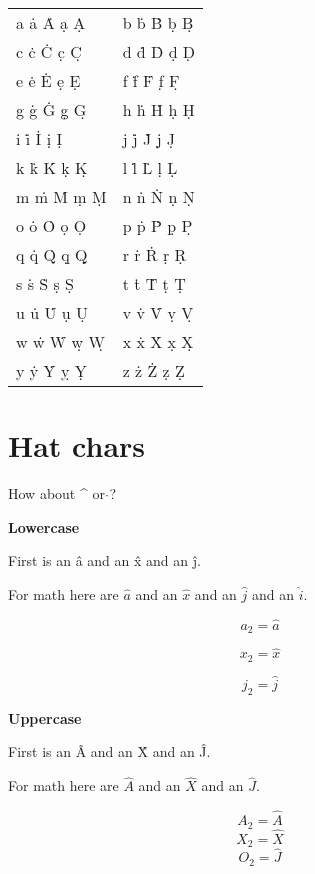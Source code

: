 \documentclass{article}
\begin{document}
\begin{tabular} {p{2in} p{2in}}
a \.{a} \.{A} \d{a} \d{A} &
b \.{b} \.{B} \d{b} \d{B} \\
c \.{c} \.{C} \d{c} \d{C} &
d \.{d} \.{D} \d{d} \d{D} \\
e \.{e} \.{E} \d{e} \d{E} &
f \.{f} \.{F} \d{f} \d{F} \\
g \.{g} \.{G} \d{g} \d{G} &
h \.{h} \.{H} \d{h} \d{H} \\
i \.{i} \.{I} \d{i} \d{I} &
j \.{j} \.{J} \d{j} \d{J} \\
k \.{k} \.{K} \d{k} \d{K} &
l \.{l} \.{L} \d{l} \d{L} \\
m \.{m} \.{M} \d{m} \d{M} &
n \.{n} \.{N} \d{n} \d{N} \\
o \.{o} \.{O} \d{o} \d{O} &
p \.{p} \.{P} \d{p} \d{P} \\
q \.{q} \.{Q} \d{q} \d{Q} &
r \.{r} \.{R} \d{r} \d{R} \\
s \.{s} \.{S} \d{s} \d{S} &
t \.{t} \.{T} \d{t} \d{T} \\
u \.{u} \.{U} \d{u} \d{U} &
v \.{v} \.{V} \d{v} \d{V} \\
w \.{w} \.{W} \d{w} \d{W} &
x \.{x} \.{X} \d{x} \d{X} \\
y \.{y} \.{Y} \d{y} \d{Y} &
z \.{z} \.{Z} \d{z} \d{Z} 
\end{tabular}



\section{Hat chars}

How about \^{} or $\hat{}$? 

\textbf{Lowercase}

First is an \^{a} and an \^{x} and an \^{j}.

For math here are $\hat{a}$ and an $\hat{x}$ and an $\hat{j}$ and an $\hat{i}$.

$$a_2=\hat{a}$$

$$x_2=\hat{x}$$

$$j_2=\hat{j}$$

\textbf{Uppercase}

First is an \^{A} and an \^{X} and an \^{J}.

For math here are $\hat{A}$ and an $\hat{X}$ and an $\hat{J}$.

$$A_2=\hat{A}$$
$$X_2=\hat{X}$$
$$O_2=\hat{J}$$


\end{document}
